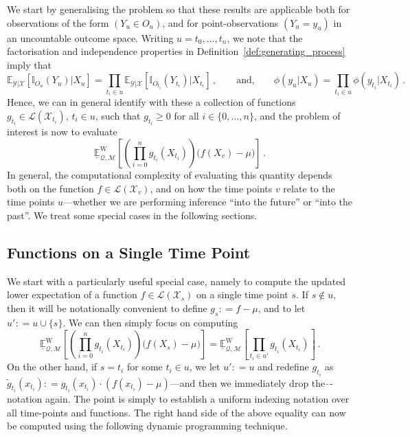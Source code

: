 \documentclass[twoside,11pt]{article}
\newcommand{\states}{\mathcal{X}}
\newcommand{\observs}{\mathcal{Y}}
\newcommand{\lexp}{\underline{\mathbb{E}}_{\rateset,\mathcal{M}}^\mathrm{W}}
\newcommand{\gambles}{\mathcal{L}}
\newcommand{\ind}[1]{\mathbb{I}_{#1}}
\newcommand{\rateset}{\mathcal{Q}}
\newcommand{\coloneqq}{:\!=}
\begin{document}
We start by generalising the problem so that these results are applicable both for observations of the form $(Y_u\in O_u)$, and for point-observations $(Y_u=y_u)$ in an uncountable outcome space. Writing $u=t_0,\ldots,t_n$, we note that the factorisation and independence properties in Definition~\ref{def:generating_process} imply that
\begin{equation*}
\mathbb{E}_{\observs\vert\states}[\ind{O_u}(Y_u)\vert X_u] = \prod_{t_i\in u}\mathbb{E}_{\observs\vert\states}[\ind{O_{t_i}}(Y_{t_i})\vert X_{t_i}]\,,\quad\quad\text{and,}\quad\quad \phi(y_u\vert X_u) = \prod_{t_i\in u}\phi(y_{t_i}\vert X_{t_i})\,.
\end{equation*}
Hence, we can in general identify with these a collection of functions $g_{t_i}\in\gambles(\states_{t_i})$, $t_i\in u$, such that $g_{t_i}\geq 0$ for all $i\in\{0,\ldots,n\}$, and the problem of interest is now to evaluate
\begin{equation*}
\lexp\left[ \left(\prod_{i=0}^ng_{t_i}(X_{t_i})\right)\bigl(f(X_v) - \mu\bigr) \right]\,.
\end{equation*}
In general, the computational complexity of evaluating this quantity depends both on the function $f\in\gambles(\states_v)$, and on how the time points $v$ relate to the time points $u$---whether we are performing inference ``into the future'' or ``into the past''. We treat some special cases in the following sections.

\subsection{Functions on a Single Time Point}\label{sec:funcs_single_time}

We start with a particularly useful special case, namely to compute the updated lower expectation of a function $f\in\gambles(\states_s)$ on a single time point $s$. If $s\notin u$, then it will be notationally convenient to define $g_s\coloneqq f - \mu$, and to let $u'\coloneqq u\cup \{s\}$. We can then simply focus on computing
\begin{equation*}
\lexp\left[ \left(\prod_{i=0}^ng_{t_i}(X_{t_i})\right)\bigl(f(X_s) - \mu\bigr) \right] = \lexp\left[ \prod_{t_i\in u'}g_{t_i}(X_{t_i})\right]\,.
\end{equation*}
On the other hand, if $s = t_i$ for some $t_i\in u$, we let $u'\coloneqq u$ and redefine $g_{t_i}$ as $\tilde{g}_{t_i}(x_{t_i})\coloneqq g_{t_i}(x_{t_i})\cdot (f(x_{t_i})-\mu)$---and then we immediately drop the $\tilde\,$-notation again. The point is simply to establish a uniform indexing notation over all time-points and functions. The right hand side of the above equality can now be computed using the following dynamic programming technique. 
\end{document}
